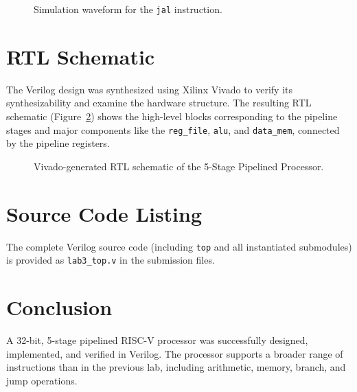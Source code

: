 \documentclass{article}
\begin{document}
\begin{figure}[H]
    \centering
    \caption{Simulation waveform for the \texttt{jal} instruction.}
    \label{fig:jal_sim}
\end{figure}

\newpage
\section{RTL Schematic}

The Verilog design was synthesized using Xilinx Vivado to verify its synthesizability and examine the hardware structure. The resulting RTL schematic (Figure~\ref{fig:rtl}) shows the high-level blocks corresponding to the pipeline stages and major components like the \texttt{reg\_file}, \texttt{alu}, and \texttt{data\_mem}, connected by the pipeline registers.

\begin{figure}[H]
    \centering
    \caption{Vivado-generated RTL schematic of the 5-Stage Pipelined Processor.}
    \label{fig:rtl}
\end{figure}

\section{Source Code Listing}
\label{sec:source}

The complete Verilog source code (including \texttt{top} and all instantiated submodules) is provided as \texttt{lab3\_top.v} in the submission files.

\section{Conclusion}

A 32-bit, 5-stage pipelined RISC-V processor was successfully designed, implemented, and verified in Verilog. The processor supports a broader range of instructions than in the previous lab, including arithmetic, memory, branch, and jump operations.
\end{document}
